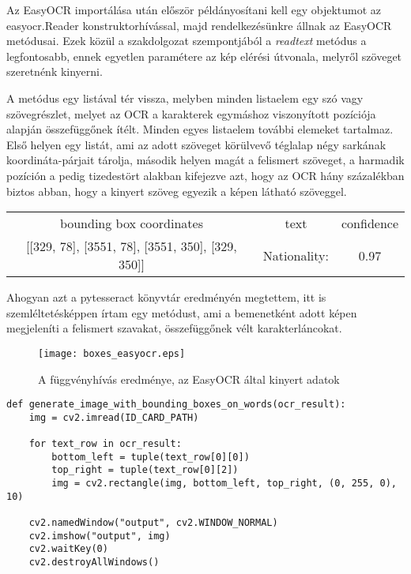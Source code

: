 \documentclass[12pt]{report}
\begin{document}
Az EasyOCR importálása után először példányosítani kell egy objektumot az easyocr.Reader konstruktorhívással, majd rendelkezésünkre állnak az EasyOCR metódusai. Ezek közül a szakdolgozat szempontjából a \textit{readtext} metódus a legfontosabb, ennek egyetlen paramétere az kép elérési útvonala, melyről szöveget szeretnénk kinyerni.

A metódus egy listával tér vissza, melyben minden listaelem egy szó vagy szövegrészlet, melyet az OCR a karakterek egymáshoz viszonyított pozíciója alapján összefüggőnek ítélt. Minden egyes listaelem további elemeket tartalmaz. Első helyen egy listát, ami az adott szöveget körülvevő téglalap négy sarkának koordináta-párjait tárolja, második helyen magát a felismert szöveget, a harmadik pozíción a pedig tizedestört alakban kifejezve azt, hogy az OCR hány százalékban biztos abban, hogy a kinyert szöveg egyezik a képen látható szöveggel.

\begin{tcolorbox}
    \begin{center}
        \begin{tabular}{ c c c }
         bounding box coordinates & text & confidence \\ 
         {[}{[}329, 78{]}, {[}3551, 78{]}, {[}3551, 350{]}, {[}329, 350{]}{]} & Nationality: & 0.97 \\
        \end{tabular}
    \end{center}
\end{tcolorbox}

Ahogyan azt a pytesseract könyvtár eredményén megtettem, itt is szemléltetésképpen írtam egy metódust, ami a bemenetként adott képen megjeleníti a felismert szavakat, összefüggőnek vélt karakterláncokat.

\pagebreak

\begin{figure}[h]
    \centerline{\texttt{[image: boxes\_easyocr.eps]}}
    \caption{A függvényhívás eredménye, az EasyOCR által kinyert adatok}
\end{figure}

\begin{verbatim}
def generate_image_with_bounding_boxes_on_words(ocr_result):
    img = cv2.imread(ID_CARD_PATH)

    for text_row in ocr_result:
        bottom_left = tuple(text_row[0][0])
        top_right = tuple(text_row[0][2])
        img = cv2.rectangle(img, bottom_left, top_right, (0, 255, 0), 10)

    cv2.namedWindow("output", cv2.WINDOW_NORMAL)
    cv2.imshow("output", img)
    cv2.waitKey(0)
    cv2.destroyAllWindows()
\end{verbatim}
\end{document}
